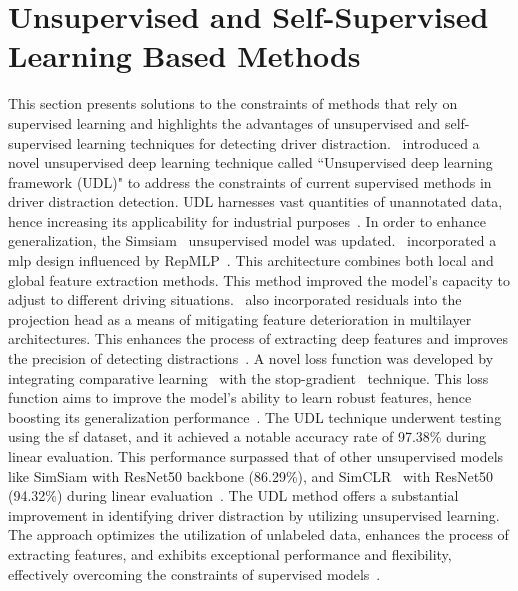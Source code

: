 \section{Unsupervised and Self-Supervised Learning Based Methods}
This section presents solutions to the constraints of methods that rely on supervised learning and highlights the advantages of unsupervised and self-supervised learning techniques for detecting driver distraction.~\citet{bing_li_2022new} introduced a novel unsupervised deep learning technique called ``Unsupervised deep learning framework (UDL)" to address the constraints of current supervised methods in driver distraction detection. UDL harnesses vast quantities of unannotated data, hence increasing its applicability for industrial purposes~\citep{bing_li_2022new}. In order to enhance generalization, the Simsiam~\citep{Simsiam_chen2021exploring_stop_grad} unsupervised model was updated.~\citet{bing_li_2022new} incorporated a \gls{mlp} design influenced by RepMLP~\citep{RepMLP_ding2021repmlp}. This architecture combines both local and global feature extraction methods. This method improved the model's capacity to adjust to different driving situations.~\citet{bing_li_2022new} also incorporated residuals into the projection head as a means of mitigating feature deterioration in multilayer architectures. This enhances the process of extracting deep features and improves the precision of detecting distractions~\citep{bing_li_2022new}. A novel loss function was developed by integrating comparative learning~\citep{comparative_learning_chen2020simple} with the stop-gradient~\citep{Simsiam_chen2021exploring_stop_grad} technique. This loss function aims to improve the model's ability to learn robust features, hence boosting its generalization performance~\citep{bing_li_2022new}. The UDL technique underwent testing using the \gls{sf} dataset, and it achieved a notable accuracy rate of 97.38\% during linear evaluation. This performance surpassed that of other unsupervised models like SimSiam with ResNet50 backbone (86.29\%), and SimCLR~\citep{Simsiam_chen2021exploring_stop_grad} with ResNet50 (94.32\%) during linear evaluation~\citep{bing_li_2022new}. The UDL method offers a substantial improvement in identifying driver distraction by utilizing unsupervised learning. The approach optimizes the utilization of unlabeled data, enhances the process of extracting features, and exhibits exceptional performance and flexibility, effectively overcoming the constraints of supervised models~\citep{bing_li_2022new}.


